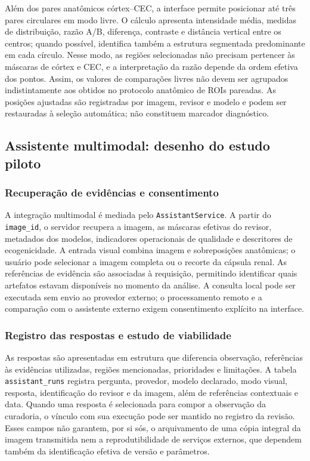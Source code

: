 \documentclass[12pt]{article}
\begin{document}
Além dos pares anatômicos córtex--CEC, a interface permite posicionar até três pares circulares em modo livre. O cálculo apresenta intensidade média, medidas de distribuição, razão A/B, diferença, contraste e distância vertical entre os centros; quando possível, identifica também a estrutura segmentada predominante em cada círculo. Nesse modo, as regiões selecionadas não precisam pertencer às máscaras de córtex e CEC, e a interpretação da razão depende da ordem efetiva dos pontos. Assim, os valores de comparações livres não devem ser agrupados indistintamente aos obtidos no protocolo anatômico de ROIs pareadas. As posições ajustadas são registradas por imagem, revisor e modelo e podem ser restauradas à seleção automática; não constituem marcador diagnóstico.

\subsection{Assistente multimodal: desenho do estudo piloto}

\subsubsection{Recuperação de evidências e consentimento}
\label{sec:curadoria_assistente_evidencias}

A integração multimodal é mediada pelo \texttt{AssistantService}. A partir do \texttt{image\_id}, o servidor recupera a imagem, as máscaras efetivas do revisor, metadados dos modelos, indicadores operacionais de qualidade e descritores de ecogenicidade. A entrada visual combina imagem e sobreposições anatômicas; o usuário pode selecionar a imagem completa ou o recorte da cápsula renal. As referências de evidência são associadas à requisição, permitindo identificar quais artefatos estavam disponíveis no momento da análise. A consulta local pode ser executada sem envio ao provedor externo; o processamento remoto e a comparação com o assistente externo exigem consentimento explícito na interface.

\subsubsection{Registro das respostas e estudo de viabilidade}
\label{sec:curadoria_assistente_registros}

As respostas são apresentadas em estrutura que diferencia observação, referências às evidências utilizadas, regiões mencionadas, prioridades e limitações. A tabela \texttt{assistant\_runs} registra pergunta, provedor, modelo declarado, modo visual, resposta, identificação do revisor e da imagem, além de referências contextuais e data. Quando uma resposta é selecionada para compor a observação da curadoria, o vínculo com sua execução pode ser mantido no registro da revisão. Esses campos não garantem, por si sós, o arquivamento de uma cópia integral da imagem transmitida nem a reprodutibilidade de serviços externos, que dependem também da identificação efetiva de versão e parâmetros.
\end{document}
